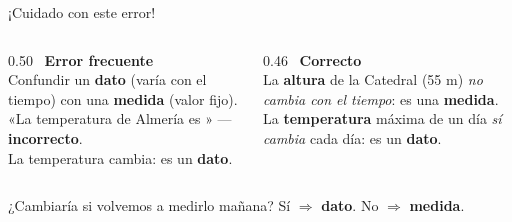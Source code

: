 \documentclass[aspectratio=169, 10pt, spanish]{beamer}
\begin{document}
\begin{frame}{¡Cuidado con este error!}
  \begin{errorbox}
    \begin{columns}[c]
      \begin{column}{0.50\textwidth}
        \incorrecto\ \textbf{Error frecuente}\\[4pt]
        Confundir un \textbf{dato} (varía con el tiempo)
        con una \textbf{medida} (valor fijo).\\[6pt]
        «La temperatura de Almería es
        » — \textbf{incorrecto}.\\
        La temperatura cambia: es un \textbf{dato}.
      \end{column}
      \begin{column}{0.46\textwidth}
        \correcto\ \textbf{Correcto}\\[4pt]
        La \textbf{altura} de la Catedral (55 m)
        \emph{no cambia con el tiempo}:
        es una \textbf{medida}.\\[6pt]
        La \textbf{temperatura} máxima de un día
        \emph{sí cambia} cada día:
        es un \textbf{dato}.
      \end{column}
    \end{columns}
  \end{errorbox}
  \vspace{8pt}
  \begin{notabox}
    \AlmFontSmall
    ¿Cambiaría si volvemos a medirlo mañana?
    \correcto\;Sí $\Rightarrow$ \textbf{dato}.\quad
    \correcto\;No $\Rightarrow$ \textbf{medida}.
  \end{notabox}
\end{frame}
\end{document}
